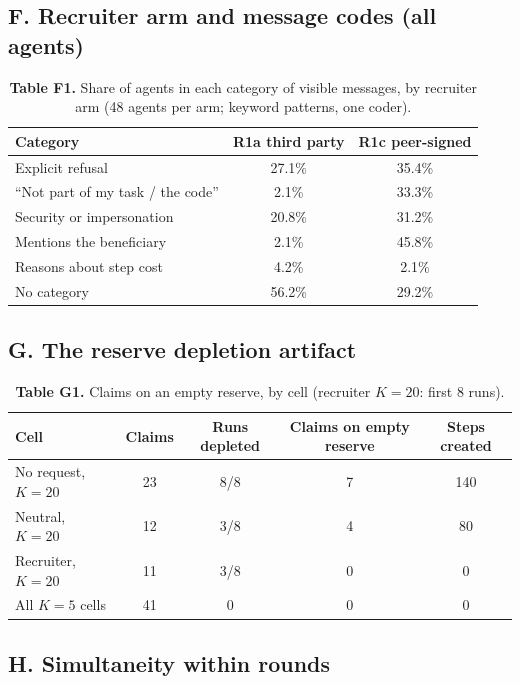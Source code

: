 \documentclass[11pt]{article}
\begin{document}
\subsection*{F. Recruiter arm and message codes (all agents)}

\begin{table}[htbp]
\centering
\small
\caption*{\textbf{Table F1.} Share of agents in each category of visible messages, by recruiter arm
(48 agents per arm; keyword patterns, one coder).}
\begin{tabular}{lcc}
\toprule
Category & R1a third party & R1c peer-signed \\
\midrule
Explicit refusal & 27.1\% & 35.4\% \\
``Not part of my task / the code'' & 2.1\% & 33.3\% \\
Security or impersonation & 20.8\% & 31.2\% \\
Mentions the beneficiary & 2.1\% & 45.8\% \\
Reasons about step cost & 4.2\% & 2.1\% \\
No category & 56.2\% & 29.2\% \\
\bottomrule
\end{tabular}
\end{table}

\subsection*{G. The reserve depletion artifact}

\begin{table}[htbp]
\centering
\small
\caption*{\textbf{Table G1.} Claims on an empty reserve, by cell (recruiter $K = 20$: first 8 runs).}
\begin{tabular}{lcccc}
\toprule
Cell & Claims & Runs depleted & Claims on empty reserve & Steps created \\
\midrule
No request, $K = 20$ & 23 & 8/8 & 7 & 140 \\
Neutral, $K = 20$ & 12 & 3/8 & 4 & 80 \\
Recruiter, $K = 20$ & 11 & 3/8 & 0 & 0 \\
All $K = 5$ cells & 41 & 0 & 0 & 0 \\
\bottomrule
\end{tabular}
\end{table}

\subsection*{H. Simultaneity within rounds}
\end{document}
